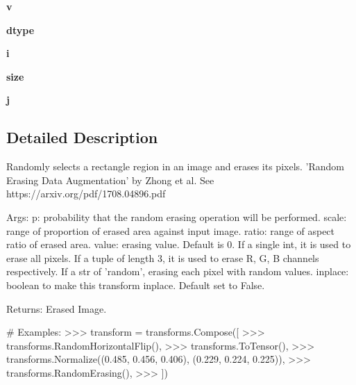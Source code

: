 \begin{DoxyCompactItemize}
\mbox{\label{classtorchvision_1_1transforms_1_1transforms_1_1RandomErasing_a07aed209239038842e05b1222ed32209}} 
{\bfseries v}
\item 
\mbox{\label{classtorchvision_1_1transforms_1_1transforms_1_1RandomErasing_a55e36282500faa3e0397c74e0589f013}} 
{\bfseries dtype}
\item 
\mbox{\label{classtorchvision_1_1transforms_1_1transforms_1_1RandomErasing_ac602e87190642d28dd522f70ed465b11}} 
{\bfseries i}
\item 
\mbox{\label{classtorchvision_1_1transforms_1_1transforms_1_1RandomErasing_ad19aa420ed1f57ca1598bd8150903805}} 
{\bfseries size}
\item 
\mbox{\label{classtorchvision_1_1transforms_1_1transforms_1_1RandomErasing_af764082c31516da5762dcc35fe7fb5ec}} 
{\bfseries j}
\end{DoxyCompactItemize}


\subsection{Detailed Description}
\begin{DoxyVerb}Randomly selects a rectangle region in an image and erases its pixels.
'Random Erasing Data Augmentation' by Zhong et al. See https://arxiv.org/pdf/1708.04896.pdf

Args:
     p: probability that the random erasing operation will be performed.
     scale: range of proportion of erased area against input image.
     ratio: range of aspect ratio of erased area.
     value: erasing value. Default is 0. If a single int, it is used to
        erase all pixels. If a tuple of length 3, it is used to erase
        R, G, B channels respectively.
        If a str of 'random', erasing each pixel with random values.
     inplace: boolean to make this transform inplace. Default set to False.

Returns:
    Erased Image.

# Examples:
    >>> transform = transforms.Compose([
    >>>   transforms.RandomHorizontalFlip(),
    >>>   transforms.ToTensor(),
    >>>   transforms.Normalize((0.485, 0.456, 0.406), (0.229, 0.224, 0.225)),
    >>>   transforms.RandomErasing(),
    >>> ])
\end{DoxyVerb}
 

